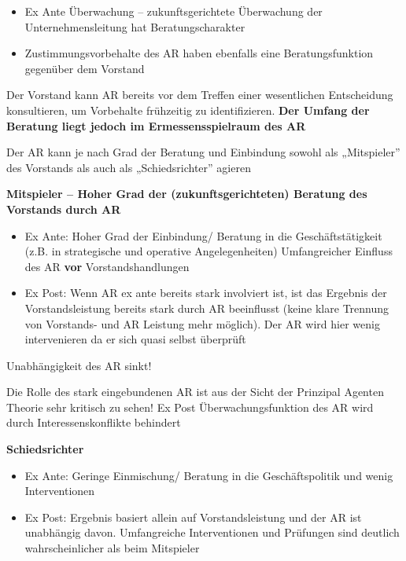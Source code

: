\documentclass[
]{article}
\providecommand{\tightlist}{%
  \setlength{\itemsep}{0pt}\setlength{\parskip}{0pt}}
\begin{document}
\begin{itemize}
\tightlist
\item
  Ex Ante Überwachung -- zukunftsgerichtete Überwachung der
  Unternehmensleitung hat Beratungscharakter
\item
  Zustimmungsvorbehalte des AR haben ebenfalls eine Beratungsfunktion
  gegenüber dem Vorstand
\end{itemize}

Der Vorstand kann AR bereits vor dem Treffen einer wesentlichen
Entscheidung konsultieren, um Vorbehalte frühzeitig zu identifizieren.
\textbf{Der Umfang der Beratung liegt jedoch im Ermessensspielraum des
AR}

Der AR kann je nach Grad der Beratung und Einbindung sowohl als
„Mitspieler'' des Vorstands als auch als „Schiedsrichter'' agieren

\textbf{Mitspieler -- Hoher Grad der (zukunftsgerichteten) Beratung des
Vorstands durch AR }

\begin{itemize}
\tightlist
\item
  Ex Ante: Hoher Grad der Einbindung/ Beratung in die Geschäftstätigkeit
  (z.B. in strategische und operative Angelegenheiten) Umfangreicher
  Einfluss des AR \textbf{vor} Vorstandshandlungen
\item
  Ex Post: Wenn AR ex ante bereits stark involviert ist, ist das
  Ergebnis der Vorstandsleistung bereits stark durch AR beeinflusst
  (keine klare Trennung von Vorstands- und AR Leistung mehr möglich).
  Der AR wird hier wenig intervenieren da er sich quasi selbst überprüft
\end{itemize}

Unabhängigkeit des AR sinkt!

Die Rolle des stark eingebundenen AR ist aus der Sicht der Prinzipal
Agenten Theorie sehr kritisch zu sehen! Ex Post Überwachungsfunktion des
AR wird durch Interessenskonflikte behindert

\textbf{Schiedsrichter }

\begin{itemize}
\tightlist
\item
  Ex Ante: Geringe Einmischung/ Beratung in die Geschäftspolitik und
  wenig Interventionen
\item
  Ex Post: Ergebnis basiert allein auf Vorstandsleistung und der AR ist
  unabhängig davon. Umfangreiche Interventionen und Prüfungen sind
  deutlich wahrscheinlicher als beim Mitspieler
\end{itemize}
\end{document}
